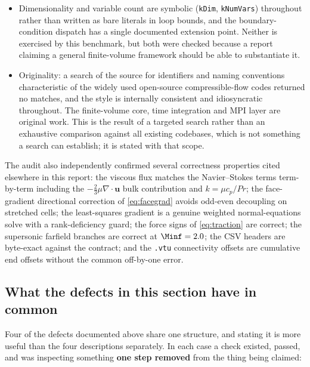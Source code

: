 \begin{itemize}
  a fixed structure, which is what allows one code path to handle a single-zone
  \texttt{PhysicalDimension} $=3$ airfoil mesh and a two-zone $=2$ cylinder mesh
  (\cref{sec:mesh}).
  \item Dimensionality and variable count are symbolic (\texttt{kDim},
  \texttt{kNumVars}) throughout rather than written as bare literals in loop bounds, and the
  boundary-condition dispatch has a single documented extension point. Neither is exercised
  by this benchmark, but both were checked because a report claiming a general
  finite-volume framework should be able to substantiate it.
  \item Originality: a search of the source for identifiers and naming conventions
  characteristic of the widely used open-source compressible-flow codes returned no
  matches, and the style is internally consistent and idiosyncratic throughout. The
  finite-volume core, time integration and MPI layer are original work. This is the
  result of a targeted search rather than an exhaustive comparison against all
  existing codebases, which is not something a search can establish; it is stated with
  that scope.
\end{itemize}

The audit also independently confirmed several correctness properties cited
elsewhere in this report: the viscous flux matches the Navier--Stokes terms
term-by-term including the $-\tfrac23\mu\nabla\!\cdot\!\mathbf{u}$ bulk
contribution and $k=\mu c_p/\mathit{Pr}$; the face-gradient directional
correction of \cref{eq:facegrad} avoids odd-even decoupling on stretched cells;
the least-squares gradient is a genuine weighted normal-equations solve with a
rank-deficiency guard; the force signs of \cref{eq:traction} are correct; the
supersonic farfield branches are correct at $\Minf=2.0$; the CSV headers are
byte-exact against the contract; and the \texttt{.vtu} connectivity offsets are
cumulative end offsets without the common off-by-one error.

\subsection{What the defects in this section have in common}
\label{sec:onelesson}

Four of the defects documented above share one structure, and stating it is more useful
than the four descriptions separately. In each case a check existed, passed, and was
inspecting something \textbf{one step removed} from the thing being claimed:

